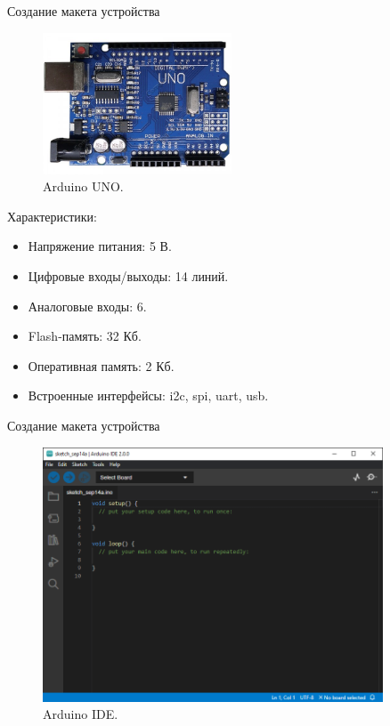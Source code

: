 \documentclass[10pt]{beamer}
\begin{document}
\begin{frame}{Создание макета устройства}
  \begin{figure}
  \includegraphics[width=0.5\textwidth]{uno}
  \caption{Arduino UNO.}
  \end{figure}
  Характеристики:
  \begin{itemize}
	\item Напряжение питания: 5 В.
	\item Цифровые входы/выходы: 14 линий.
	\item Аналоговые входы: 6.
	\item Flash-память: 32 Кб.
	\item Оперативная память: 2 Кб.
	\item Встроенные интерфейсы: i2c, spi, uart, usb.
  \end{itemize}
\end{frame}

\begin{frame}{Создание макета устройства}
  \begin{figure}
  \includegraphics[width=0.9\textwidth]{ide}
  \caption{Arduino IDE.}
  \end{figure}
\end{frame}
\end{document}
